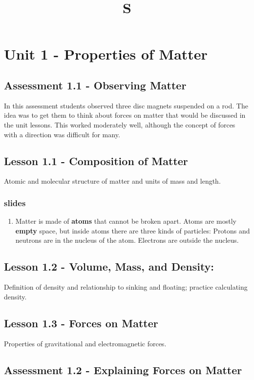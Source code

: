 \documentclass[12pt]{article}
\title{S}
\begin{document}
\section{Unit 1 - Properties of Matter}

\subsection{Assessment 1.1 - Observing Matter} 

In this assessment students observed three disc magnets
suspended on a rod. The idea was to get them to think about forces on matter that would be
discussed in the unit lessons. This worked moderately well, although the concept of forces with
a direction was difficult for many.

\subsection{Lesson 1.1 - Composition of Matter} 

Atomic and molecular structure of matter and units of mass and length.

\subsubsection{slides}

\begin{enumerate}
    \item Matter is made of \textbf{atoms} that cannot be broken apart.
    Atoms are mostly \textbf{empty} space, but inside atoms there are three kinds of particles:
    Protons and neutrons are in the nucleus of the atom.
    Electrons are outside the nucleus.
\end{enumerate}

\subsection{Lesson 1.2 - Volume, Mass, and Density:} 

Definition of density and relationship to sinking
and floating; practice calculating density.

\subsection{Lesson 1.3 - Forces on Matter}

Properties of gravitational and electromagnetic forces.

\subsection{Assessment 1.2 - Explaining Forces on Matter} 
\end{document}
